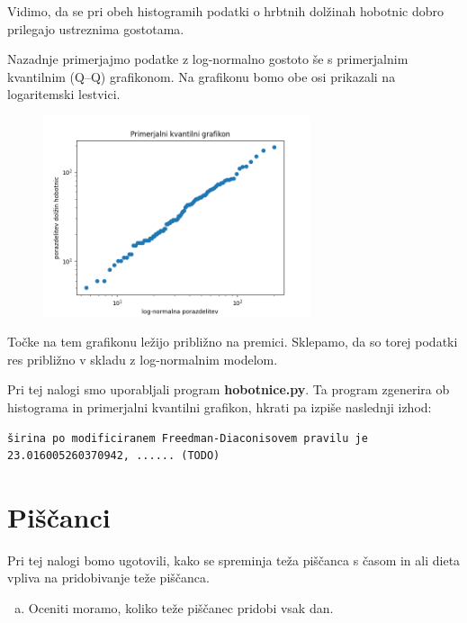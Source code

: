\documentclass[a4paper,12pt]{article}
\theoremstyle{definition}
\theoremstyle{plain}
\begin{document}
Vidimo, da se pri obeh histogramih podatki o hrbtnih dolžinah hobotnic dobro prilegajo ustreznima gostotama.

Nazadnje primerjajmo podatke z log-normalno gostoto še s primerjalnim kvantilnim (Q–Q) grafikonom. Na grafikonu bomo obe osi prikazali na logaritemski lestvici.

\begin{figure}[H]
    \centering
    \label{fig:hist1}
    \includegraphics[width=0.7\textwidth]{PrimerjalniGrafikon.png}
\end{figure}

Točke na tem grafikonu ležijo približno na premici. Sklepamo, da so torej podatki res približno v skladu z log-normalnim modelom.

Pri tej nalogi smo uporabljali program \textbf{hobotnice.py}. Ta program zgenerira ob histograma in primerjalni kvantilni grafikon, hkrati pa izpiše naslednji izhod:

\begin{verbatim}
širina po modificiranem Freedman-Diaconisovem pravilu je 23.016005260370942, ...... (TODO)
\end{verbatim}

\section{Piščanci}
Pri tej nalogi bomo ugotovili, kako se spreminja teža piščanca s časom in ali dieta vpliva na pridobivanje teže piščanca.

\begin{enumerate}[a)]
    \item Oceniti moramo, koliko teže piščanec pridobi vsak dan.
\end{enumerate}
\end{document}
